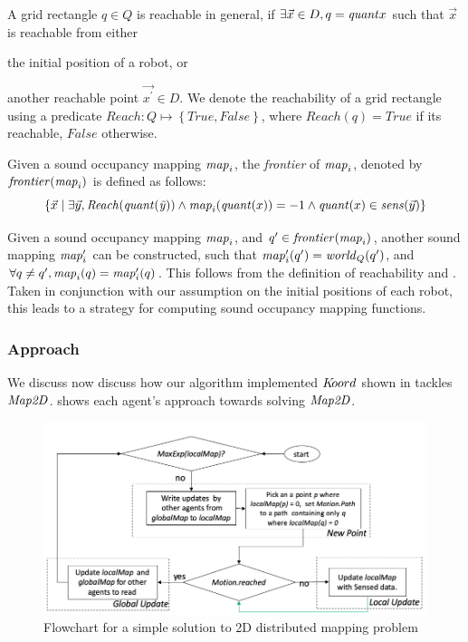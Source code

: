 A grid rectangle $q\in Q$ is reachable in general, if $\exists \Vec{x}\in D, q = \mathit{quant}{x}$ such that $\Vec{x}$ is reachable from either \begin{inparaenum} [(a)]\item the initial position of a robot, or \item another reachable point $\Vec{x^\prime}\in D$. We denote the reachability of a grid rectangle using a predicate $\mathit{Reach} : Q \mapsto \left\{\mathit{True}, \mathit{False}\right\}$, where $\mathit{Reach}(q) = \mathit{True}$ if its reachable,  $\mathit{False}$ otherwise.
\end{inparaenum}

\begin{definition}
    Given a sound occupancy mapping $\mathit{map}_i$, the \emph{frontier} of $\mathit{map}_i$, denoted by $\mathit{frontier}(\mathit{map}_i)$ is defined as follows:
    $$ \left\{ \Vec{x} \mid \exists \Vec{y}, \mathit{Reach(\mathit{quant}({\Vec{y}})}) \wedge \mathit{map}_i(\mathit{quant}(x)) = -1 \wedge \mathit{quant}(x) \in \mathit{sens}(\Vec{y})\right\} $$
\end{definition}

Given a sound occupancy mapping $\mathit{map}_i$, and $q^\prime \in \mathit{frontier}(\mathit{map}_i)$, another sound mapping $\mathit{map}_i^\prime$ can be constructed, such that $\mathit{map}_i^\prime(q^\prime) = \mathit{world}_Q(q^\prime)$, and $\forall q \neq q^\prime,\mathit{map}_i(q) = \mathit{map}_i^\prime(q)$. This follows from the definition of reachability and . Taken in conjunction with our assumption on the initial positions of each robot, this leads to a strategy for computing sound occupancy mapping functions.



\subsubsection{Approach}
We discuss now discuss how our algorithm implemented $K\kern-2pt oord$ shown in  tackles $\mathit{Map2D}$.  shows each agent's approach towards solving $\mathit{Map2D}$.

\begin{figure}[!htbp]
    \centering
    \includegraphics[width=\linewidth]{figs/map_flowchart.png}
    \caption{Flowchart for a simple solution to 2D distributed mapping problem\vspace{-2mm}}
    \label{fig:flowmap}
\end{figure}

